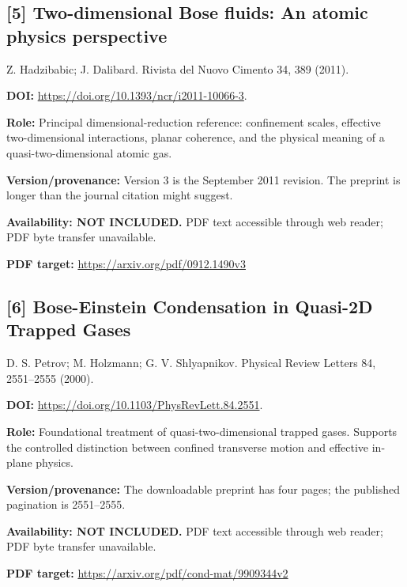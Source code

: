 \documentclass[11pt,a4paper]{article}
\begin{document}
\begin{minipage}{\textwidth}
\subsection*{[5] Two-dimensional Bose fluids: An atomic physics perspective}
Z. Hadzibabic; J. Dalibard. Rivista del Nuovo Cimento 34, 389 (2011).

\textbf{DOI:} \url{https://doi.org/10.1393/ncr/i2011-10066-3}.

\textbf{Role:} Principal dimensional-reduction reference: confinement scales, effective two-dimensional interactions, planar coherence, and the physical meaning of a quasi-two-dimensional atomic gas.

\textbf{Version/provenance:} Version 3 is the September 2011 revision. The preprint is longer than the journal citation might suggest.

\textbf{Availability: NOT INCLUDED.} PDF text accessible through web reader; PDF byte transfer unavailable.\par
\textbf{PDF target:} \url{https://arxiv.org/pdf/0912.1490v3}
\end{minipage}
\par\medskip
\begin{minipage}{\textwidth}
\subsection*{[6] Bose-Einstein Condensation in Quasi-2D Trapped Gases}
D. S. Petrov; M. Holzmann; G. V. Shlyapnikov. Physical Review Letters 84, 2551--2555 (2000).

\textbf{DOI:} \url{https://doi.org/10.1103/PhysRevLett.84.2551}.

\textbf{Role:} Foundational treatment of quasi-two-dimensional trapped gases. Supports the controlled distinction between confined transverse motion and effective in-plane physics.

\textbf{Version/provenance:} The downloadable preprint has four pages; the published pagination is 2551--2555.

\textbf{Availability: NOT INCLUDED.} PDF text accessible through web reader; PDF byte transfer unavailable.\par
\textbf{PDF target:} \url{https://arxiv.org/pdf/cond-mat/9909344v2}
\end{minipage}
\par\medskip
\end{document}
